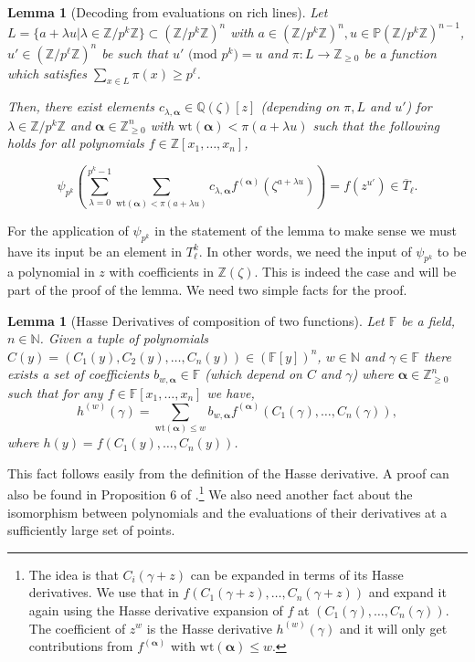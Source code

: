 \documentclass[11pt]{article}
\numberwithin{equation}{section}
\newtheorem{lem}[thm]{Lemma}
\def\F{{\mathbb{F}}}
\def\Q{{\mathbb{Q}}}
\def\Z{{\mathbb{Z}}}
\def\N{{\mathbb{N}}}
\def\P{{\mathbb{P}}}
\def\balpha{{\bm \alpha}}
\begin{document}
\begin{lem}[Decoding from evaluations on rich lines]\label{lem:deRich}
Let $L=\{a+\lambda u| \lambda \in \Z/p^k\Z\}\subset (\Z/p^k\Z)^n$ with $a\in (\Z/p^k\Z)^n,u\in \P (\Z/p^k\Z)^{n-1}$, $u'\in (\Z/p^\ell\Z)^n$ be such that {\em $u'\text{ (mod }p^k\text{)}=u$} and $\pi:L\rightarrow \Z_{\ge 0}$ be a function which satisfies $\sum_{x\in L} \pi(x) \ge p^\ell$. 


Then, there exist elements $c_{\lambda,\balpha} \in \Q(\zeta)[z]$ (depending on $\pi,L$ and $u'$) for $\lambda \in \Z/p^k\Z$ and $\balpha\in  \Z_{\ge 0}^n$ with $\text{wt}(\balpha)< \pi(a+\lambda u)$ such that the following holds for all polynomials $f\in \Z[x_1,\hdots,x_n]$,

{\em$$ \psi_{p^k}\left(\sum\limits_{\lambda =0}^{p^k-1}\sum\limits_{\text{wt}(\balpha) < \pi(a+\lambda u) }c_{\lambda,\balpha} f^{(\balpha)}(\zeta^{a+\lambda u})\right)= f(z^{u'})\in \overline{T}_\ell .$$}
\end{lem}
For the application of $\psi_{p^k}$ in the statement of the lemma to make sense we must have its input be an element in $T_\ell^k$. In other words, we need the input of $\psi_{p^k}$ to be a polynomial in $z$ with coefficients in $\Z(\zeta)$. This is indeed the case and will be part of the proof of the lemma. We need two simple facts for the proof.

\begin{lem}[Hasse Derivatives of composition of two functions]\label{fact:com}
Let $\F$ be a field, $n\in \N$. Given a tuple of polynomials $C(y)=(C_1(y),C_2(y),\hdots,C_n(y))\in (\F[y])^n$, $w\in \N$ and $\gamma\in \F$ there exists a set of coefficients $b_{w,\balpha}\in \F$ (which depend on $C$ and $\gamma$) where $\balpha \in \Z^n_{\ge 0}$ such that for any $f\in \F[x_1,\hdots,x_n]$ we have,
$$h^{(w)}(\gamma)=\sum\limits_{\text{wt}(\balpha)\le w} b_{w,\balpha} f^{(\balpha)}(C_1(\gamma),\hdots,C_n(\gamma)), $$
where $h(y)=f(C_1(y),\hdots,C_n(y))$. 

\end{lem}

This fact follows easily from the definition of the Hasse derivative. A proof can also be found in Proposition 6 of \cite{dvir2013extensions}.\footnote{The idea is that $C_i(\gamma+z)$ can be expanded in terms of its Hasse derivatives. We use that in $f(C_1(\gamma+z),\hdots,C_n(\gamma+z))$ and expand it again using the Hasse derivative expansion of $f$ at $(C_1(\gamma),\hdots,C_n(\gamma))$. The coefficient of $z^w$ is the Hasse derivative $h^{(w)}(\gamma)$ and it will only get contributions from $f^{(\balpha)}$ with $\text{wt}(\balpha)\le w$.} We also need another fact about the isomorphism between polynomials and the evaluations of their derivatives at a sufficiently large set of points.
\end{document}
